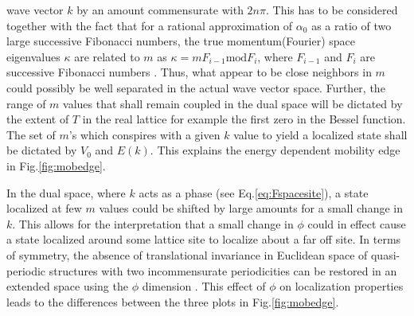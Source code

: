 wave vector $k$ by an amount commensurate with $2n\pi$. This has to be
considered together with the fact that for a rational approximation of
$\alpha_0$ as a ratio of two large successive Fibonacci numbers, the
true momentum(Fourier) space eigenvalues $\kappa$ are related to $m$
as $ \kappa = mF_{i-1}\textrm{mod}F_i$, where $F_{i-1}$ and $F_i$ are
successive Fibonacci numbers \parencite{kohmoto1983metal,aulbach2004phase}. Thus, what appear
to be close neighbors in $m$ could possibly be well separated in the
actual wave vector space. Further, the range of $m$ values that shall
remain coupled in the dual space will be dictated by the extent of
$T$ in the real lattice for example the first zero in the Bessel
function. The set of $m$'s which conspires with a given $k$ value to
yield a localized state shall be dictated by $V_0$ and $E(k)$. This
explains the energy dependent mobility edge in Fig.\ref{fig:mobedge}. 

In the dual space, where $k$ acts as a phase (see Eq.\eqref{eq:Fspacesite}), a
state localized at few $m$ values could be  shifted by large amounts
for a small change in $k$. This allows for the interpretation that a
small change in $\phi$ could in effect cause a state localized around
some lattice site to localize about a far off site.
 In terms of symmetry, the absence of 
translational invariance in Euclidean space of quasi-periodic
structures with two incommensurate periodicities can be restored in an
extended space using the $\phi$ dimension \cite{sokoloff1985unusual, janner1977symmetry}. This
effect of $\phi$ on localization properties leads to the differences between the
three plots in Fig.\ref{fig:mobedge}.  
